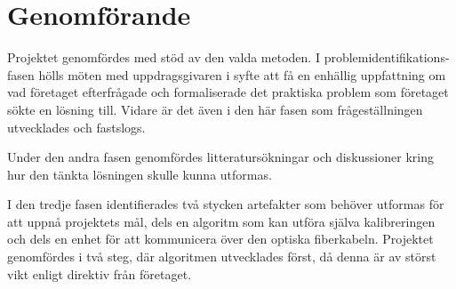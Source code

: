 \section{Genomförande} %
\label{sec:genomf_rande}

    Projektet genomfördes med stöd av den valda metoden. I problemidentifikations-fasen hölls möten med uppdragsgivaren i syfte att få en enhällig uppfattning om vad företaget efterfrågade och formaliserade det praktiska problem som företaget sökte en lösning till. Vidare är det även i den här fasen som frågeställningen utvecklades och fastslogs. \bigskip

    Under den andra fasen genomfördes litteratursökningar och diskussioner kring hur den tänkta lösningen skulle kunna utformas.  \bigskip

    I den tredje fasen identifierades två stycken artefakter som behöver utformas för att uppnå projektets mål, dels en algoritm som kan utföra själva kalibreringen och dels en enhet för att kommunicera över den optiska fiberkabeln. Projektet genomfördes i två steg, där algoritmen utvecklades först, då denna är av störst vikt enligt direktiv från företaget.

